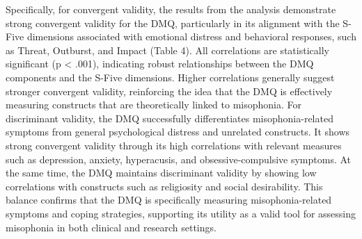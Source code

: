 Specifically, for convergent validity, the results from the analysis demonstrate strong convergent validity for the DMQ, particularly in its alignment with the S-Five dimensions associated with emotional distress and behavioral responses, such as Threat, Outburst, and Impact (Table 4). All correlations are statistically significant (p < .001), indicating robust relationships between the DMQ components and the S-Five dimensions. Higher correlations generally suggest stronger convergent validity, reinforcing the idea that the DMQ is effectively measuring constructs that are theoretically linked to misophonia.
For discriminant validity, the DMQ successfully differentiates misophonia-related symptoms from general psychological distress and unrelated constructs. It shows strong convergent validity through its high correlations with relevant measures such as depression, anxiety, hyperacusis, and obsessive-compulsive symptoms. At the same time, the DMQ maintains discriminant validity by showing low correlations with constructs such as religiosity and social desirability. This balance confirms that the DMQ is specifically measuring misophonia-related symptoms and coping strategies, supporting its utility as a valid tool for assessing misophonia in both clinical and research settings.


